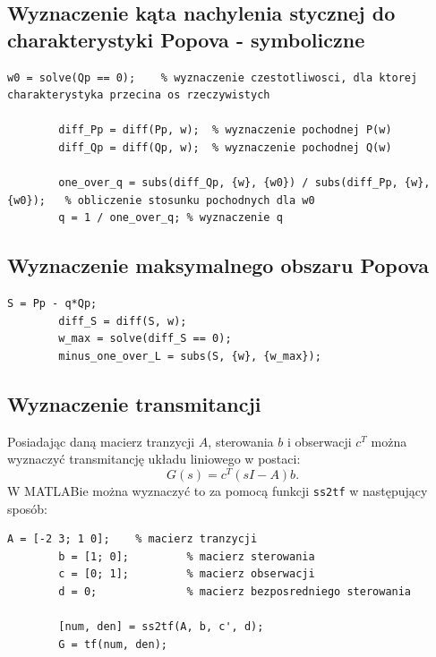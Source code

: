 \documentclass{article}
\begin{document}
    \subsection{Wyznaczenie kąta nachylenia stycznej do charakterystyki Popova - symboliczne}
    \begin{lstlisting}[style=Matlab-editor]
        w0 = solve(Qp == 0);    % wyznaczenie czestotliwosci, dla ktorej charakterystyka przecina os rzeczywistych

        diff_Pp = diff(Pp, w);  % wyznaczenie pochodnej P(w)
        diff_Qp = diff(Qp, w);  % wyznaczenie pochodnej Q(w)
        
        one_over_q = subs(diff_Qp, {w}, {w0}) / subs(diff_Pp, {w}, {w0});   % obliczenie stosunku pochodnych dla w0
        q = 1 / one_over_q; % wyznaczenie q
    \end{lstlisting}

    \subsection{Wyznaczenie maksymalnego obszaru Popova}
    \begin{lstlisting}[style=Matlab-editor]
        S = Pp - q*Qp;
        diff_S = diff(S, w);
        w_max = solve(diff_S == 0);
        minus_one_over_L = subs(S, {w}, {w_max});
    \end{lstlisting}    

    \subsection{Wyznaczenie transmitancji}
    Posiadając daną macierz tranzycji $A$, sterowania $b$ i obserwacji $c^{T}$ można wyznaczyć transmitancję układu liniowego w postaci:
    $$
        G(s) = c^{T}(sI - A)b.
    $$
    W MATLABie można wyznaczyć to za pomocą funkcji \texttt{ss2tf} w następujący sposób:
    \begin{lstlisting}[style=Matlab-editor]
        A = [-2 3; 1 0];    % macierz tranzycji
        b = [1; 0];         % macierz sterowania
        c = [0; 1];         % macierz obserwacji
        d = 0;              % macierz bezposredniego sterowania

        [num, den] = ss2tf(A, b, c', d);
        G = tf(num, den);
    \end{lstlisting}
\end{document}
